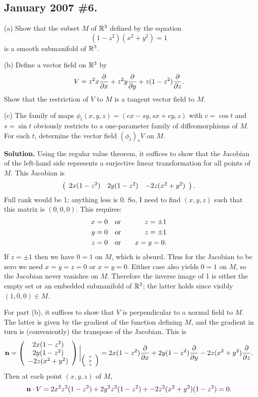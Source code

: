 \documentclass[10pt]{article}
\numberwithin{equation}{subsection}
\begin{document}
\subsection{January 2007 \#6.}

(a) Show that the subset $M$ of $\mathbb{R}^3$ defined by the equation
$$
	(1-z^2)(x^2+y^2)=1
$$
is a smooth submanifold of $\mathbb{R}^3$.

(b) Define a vector field on $\mathbb{R}^3$ by
$$
	V = z^2 x \frac{\partial}{\partial x} + z^2 y \frac{\partial}{\partial y} + z(1-z^2) \frac{\partial}{\partial z}.
$$
Show that the restriction of $V$ to $M$ is a tangent vector field to $M$.

(c) The family of maps $\phi_t(x,y,z) = (cx-sy,sx+cy,z)$ with $c=\cos t$ and
$s=\sin t$ obviously restricts to a one-parameter family of diffeomorphisms
of $M$.  For each $t$, determine the vector field $(\phi_t)_* V$ on $M$.

\textbf{Solution.} Using the regular value theorem, it suffices to show that
the Jacobian of the left-hand side represents a surjective linear
transformation for all points of $M$.  This Jacobian is
$$
	\left(\begin{array}{cccccccccccc} 
		2x(1-z^2) &
		2y(1-z^2) &
		-2z(x^2+y^2)
	 \end{array}\right).
$$
Full rank would be 1; anything less is 0.  So, I need to find $(x,y,z)$
such that this matrix is $(0,0,0)$.  This requires:
\begin{eqnarray*}
	x=0 &\quad\textrm{or}\quad& z = \pm 1 \\
	y=0 &\quad\textrm{or}\quad& z = \pm 1 \\
	z=0 &\quad\textrm{or}\quad& x=y=0.
\end{eqnarray*}
If $z=\pm 1$ then we have $0=1$ on $M$, which is absurd.  Thus for the Jacobian
to be zero we need $x=y=z=0$ or $x=y=0$.  Either case also yields $0=1$ on $M$,
so the Jacobian never vanishes on $M$.  Therefore the inverse image of 1
is either the empty set or an embedded submanifold of $\mathbb{R}^3$; the latter
holds since visibly $(1,0,0) \in M$.

For part (b), it suffices to show that $V$ is perpendicular to a normal field
to $M$.  The latter is given by the gradient of the function defining $M$,
and the gradient in turn is (conveniently) the transpose of the Jacobian.
This is
$$
	\mathbf{n} =
	\left(\begin{array}{cccccccccccc} 
		2x(1-z^2) \\
		2y(1-z^2) \\
		-2z(x^2+y^2)
	 \end{array}\right)\bigg|_{\tiny{\left(\begin{array}{r} x \\ y \\ z\end{array}\right)}}
	= 2x(1-z^2) \frac{\partial}{\partial x}
	+ 2y(1-z^2) \frac{\partial}{\partial y}
	- 2z(x^2+y^2) \frac{\partial}{\partial z}.
$$
Then at each point $(x,y,z)$ of $M$,
$$
	\mathbf{n} \cdot V =
	2x^2z^2(1-z^2) +
	2y^2z^2(1-z^2) +
	-2z^2(x^2+y^2)(1-z^2) = 0.
$$
\end{document}
